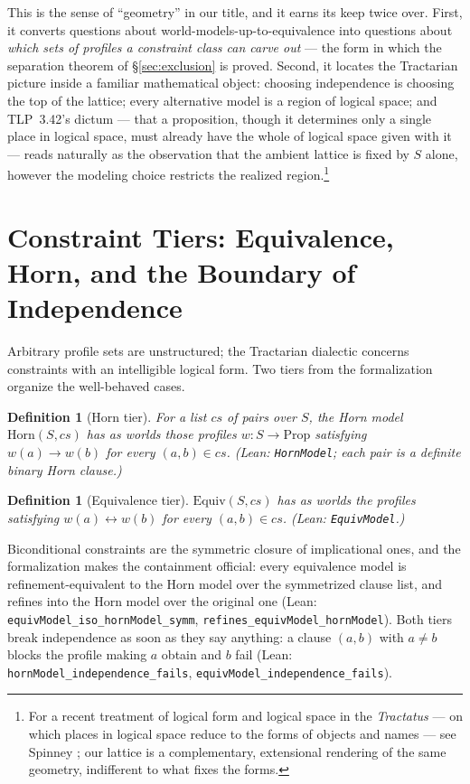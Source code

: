 \documentclass[10pt, letterpaper]{article}
\newtheorem{definition}[theorem]{Definition}
\theoremstyle{remark}
\newcommand{\lean}[1]{\texttt{#1}}
\newcommand{\TLP}[1]{TLP~#1}
\begin{document}
This is the sense of ``geometry'' in our title, and it earns its keep twice
over. First, it converts questions about world-models-up-to-equivalence into
questions about \emph{which sets of profiles a constraint class can carve
out} --- the form in which the separation theorem of \S\ref{sec:exclusion}
is proved. Second, it locates the Tractarian picture inside a familiar
mathematical object: choosing independence is choosing the top of the
lattice; every alternative model is a region of logical space; and
\TLP{3.42}'s dictum --- that a proposition, though it determines only a
single place in logical space, must already have the whole of logical space
given with it \cite{wittgenstein1921} --- reads naturally as the observation
that the ambient lattice is fixed by $S$ alone, however the modeling choice
restricts the realized region.\footnote{For a recent treatment of logical
form and logical space in the \emph{Tractatus} --- on which places in
logical space reduce to the forms of objects and names --- see Spinney
\cite{spinney2022}; our lattice is a complementary, extensional rendering of
the same geometry, indifferent to what fixes the forms.}

\section{Constraint Tiers: Equivalence, Horn, and the Boundary of
  Independence}\label{sec:tiers}

Arbitrary profile sets are unstructured; the Tractarian dialectic concerns
constraints with an intelligible logical form. Two tiers from the
formalization organize the well-behaved cases.

\begin{definition}[Horn tier]\label{def:horn}
For a list $\mathit{cs}$ of pairs over $S$, the \emph{Horn model}
$\mathrm{Horn}(S, \mathit{cs})$ has as worlds those profiles
$w : S \to \mathrm{Prop}$ satisfying $w(a) \to w(b)$ for every
$(a, b) \in \mathit{cs}$. (Lean: \lean{HornModel}; each pair is a definite
binary Horn clause.)
\end{definition}

\begin{definition}[Equivalence tier]\label{def:equiv}
$\mathrm{Equiv}(S, \mathit{cs})$ has as worlds the profiles satisfying
$w(a) \leftrightarrow w(b)$ for every $(a, b) \in \mathit{cs}$. (Lean:
\lean{EquivModel}.)
\end{definition}

Biconditional constraints are the symmetric closure of implicational ones,
and the formalization makes the containment official: every equivalence model
is refinement-equivalent to the Horn model over the symmetrized clause list,
and refines into the Horn model over the original one (Lean:
\lean{equivModel\_iso\_hornModel\_symm}, \lean{refines\_equivModel\_hornModel}).
Both tiers break independence as soon as they say anything: a clause
$(a, b)$ with $a \neq b$ blocks the profile making $a$ obtain and $b$ fail
(Lean: \lean{hornModel\_independence\_fails},
\lean{equivModel\_independence\_fails}).
\end{document}
